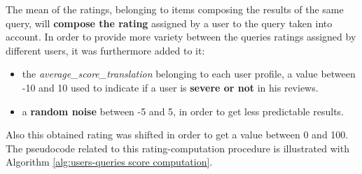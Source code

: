The mean of the ratings, belonging to items composing the results of the same query, will \textbf{compose the rating} assigned by a user to the query taken into account. In order to provide more variety between the queries ratings assigned by different users, it was furthermore added to it:
\begin{itemize}
    \item the \textit{average\_score\_translation} belonging to each user profile, a value between -10 and 10 used to indicate if a user is \textbf{severe or not} in his reviews.
    \item a \textbf{random noise} between -5 and 5, in order to get less predictable results.
\end{itemize}
Also this obtained rating was shifted in order to get a value between 0 and 100. The pseudocode related to this rating-computation procedure is illustrated with Algorithm \ref{alg:users-queries score computation}.

